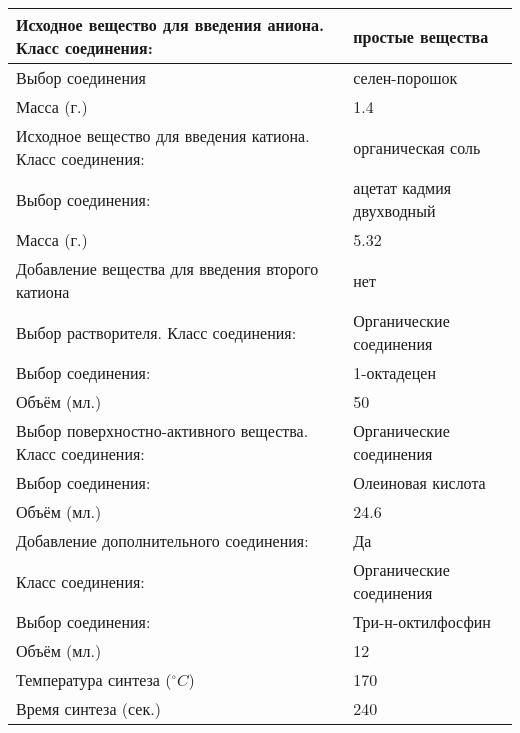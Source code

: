 \begin{enumerate}
    \begin{table}[H]
        \begin{center}
            \begin{tabular}{|p{9cm}|p{4cm}|}
                \hline
                Исходное вещество для введения аниона. Класс соединения:	&простые вещества\\
                \hline
                Выбор соединения	&селен-порошок\\
                \hline
                Масса (г.)	&1.4\\
                \hline
                Исходное вещество для введения катиона. Класс соединения:	&органическая соль\\
                \hline
                Выбор соединения:	&ацетат кадмия двухводный\\
                \hline
                Масса (г.)	&5.32\\
                \hline
                Добавление вещества для введения второго катиона	&нет\\
                \hline
                Выбор растворителя. Класс соединения:&	Органические соединения\\
                \hline
                Выбор соединения:	&1-октадецен\\
                \hline
                Объём (мл.)	&50\\
                \hline
                Выбор поверхностно-активного вещества. Класс соединения:	&Органические соединения \\
                \hline
                Выбор соединения:	&Олеиновая кислота \\
                \hline
                Объём (мл.)	&24.6 \\
                \hline
                Добавление дополнительного соединения:	&Да \\
                \hline
                Класс соединения:	&Органические соединения \\
                \hline
                Выбор соединения:	&Три-н-октилфосфин \\
                \hline
                Объём (мл.)	&12 \\
                \hline
                Температура синтеза ($^\circ C$)	&170 \\
                \hline
                Время синтеза (сек.)	&240 \\
                \hline
            \end{tabular}
        \end{center}
    \end{table}


\end{enumerate}
